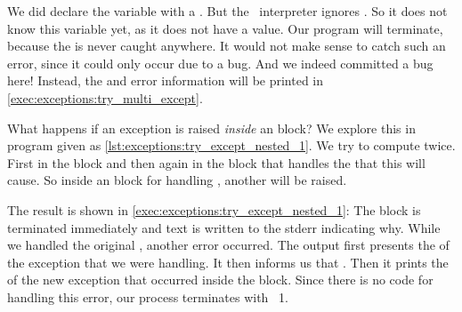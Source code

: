 We did declare the variable with a .
But the \python\ interpreter ignores .
So it does not know this variable yet, as it does not have a value.
Our program will terminate, because the  is never caught anywhere.
It would not make sense to catch such an error, since it could only occur due to a bug.
And we indeed committed a bug here!
Instead, the  and error information will be printed in \cref{exec:exceptions:try_multi_except}.%
%
%
%
\FloatBarrier%
\endhsection%
%
%
%
%
%
%
\begin{sloppypar}%
What happens if an exception is raised \emph{inside} an  block?
We explore this in program  given as \cref{lst:exceptions:try_except_nested_1}.
We try to compute  twice.
First in the  block and then again in the  block that handles the  that this will cause.
So inside an  block for handling , another  will be raised.%
\end{sloppypar}%
%
The result is shown in \cref{exec:exceptions:try_except_nested_1}:
The  block is terminated immediately and text is written to the \gls{stderr} indicating why.
While we handled the original , another error occurred.
The output first presents the  of the exception that we were handling.
It then informs us that .
Then it prints the  of the new exception that occurred inside the  block.
Since there is no code for handling this error, our process terminates with ~1.

